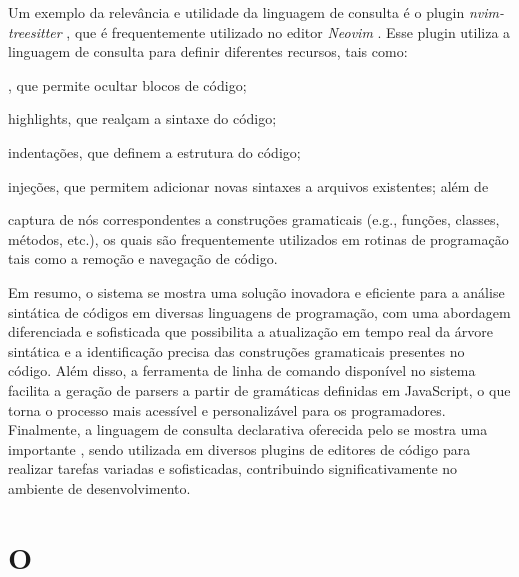 \documentclass
  [11pt,a4paper,english,brazil,openright,sumario=tradicional,twoside]
  {abntex2}
\begin{document}
  Um exemplo da relevância e utilidade da linguagem de consulta é o plugin
  \textit{nvim-treesitter} \cite{nvim-treesitter-2023-nvim}, que é
  frequentemente utilizado no editor \textit{Neovim}
  \cite{neovim-2023-hyperextensible}. Esse plugin utiliza a linguagem de
  consulta para definir diferentes recursos, tais como:
  \begin{inparaenum}
    \item \textit{}, que permite ocultar blocos de código;
    \item highlights, que realçam a sintaxe do código;
    \item indentações, que definem a estrutura do código;
    \item injeções, que permitem adicionar novas sintaxes a arquivos
          existentes; além de
    \item captura de nós correspondentes a construções gramaticais (e.g.,
          funções, classes, métodos, etc.), os quais são frequentemente
          utilizados em rotinas de programação tais como a remoção e navegação
          de código.
  \end{inparaenum}

  Em resumo, o sistema \treesitter se mostra uma solução inovadora e eficiente
  para a análise sintática de códigos em diversas linguagens de programação,
  com uma abordagem diferenciada e sofisticada que possibilita a atualização em
  tempo real da árvore sintática e a identificação precisa das construções
  gramaticais presentes no código. Além disso, a ferramenta de linha de comando
  disponível no sistema facilita a geração de parsers a partir de gramáticas
  definidas em JavaScript, o que torna o processo mais acessível e
  personalizável para os programadores. Finalmente, a linguagem de consulta
  declarativa oferecida pelo \treesitter se mostra uma importante
  \textit{}, sendo utilizada em diversos plugins de editores de
  código para realizar tarefas variadas e sofisticadas, contribuindo
  significativamente no ambiente de desenvolvimento.


  \chapter{O \witchcooking}
  \label{chapter:witch}

\end{document}
